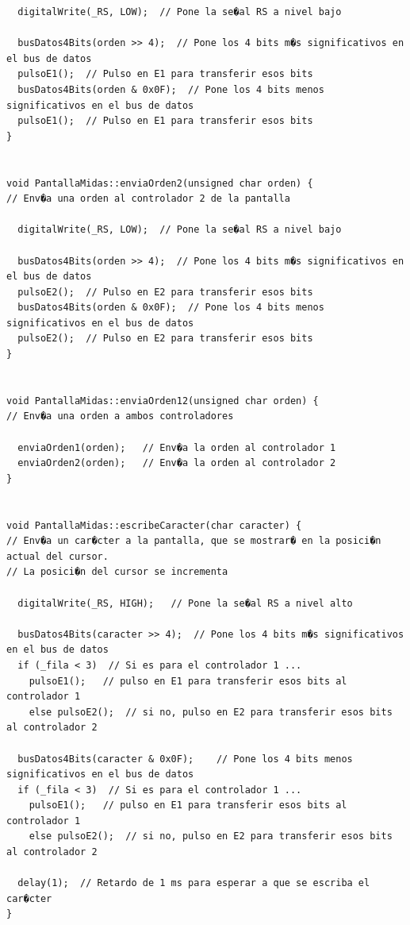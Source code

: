 \documentclass[11pt,twoside]{book}
\begin{document}
\begin{lstlisting}
  digitalWrite(_RS, LOW);  // Pone la se�al RS a nivel bajo
  
  busDatos4Bits(orden >> 4);  // Pone los 4 bits m�s significativos en el bus de datos
  pulsoE1();  // Pulso en E1 para transferir esos bits
  busDatos4Bits(orden & 0x0F);  // Pone los 4 bits menos significativos en el bus de datos
  pulsoE1();  // Pulso en E1 para transferir esos bits
}


void PantallaMidas::enviaOrden2(unsigned char orden) {
// Env�a una orden al controlador 2 de la pantalla

  digitalWrite(_RS, LOW);  // Pone la se�al RS a nivel bajo
  
  busDatos4Bits(orden >> 4);  // Pone los 4 bits m�s significativos en el bus de datos
  pulsoE2();  // Pulso en E2 para transferir esos bits
  busDatos4Bits(orden & 0x0F);  // Pone los 4 bits menos significativos en el bus de datos
  pulsoE2();  // Pulso en E2 para transferir esos bits
}


void PantallaMidas::enviaOrden12(unsigned char orden) {
// Env�a una orden a ambos controladores

  enviaOrden1(orden);   // Env�a la orden al controlador 1
  enviaOrden2(orden);   // Env�a la orden al controlador 2
}


void PantallaMidas::escribeCaracter(char caracter) {
// Env�a un car�cter a la pantalla, que se mostrar� en la posici�n actual del cursor. 
// La posici�n del cursor se incrementa

  digitalWrite(_RS, HIGH);   // Pone la se�al RS a nivel alto
  
  busDatos4Bits(caracter >> 4);  // Pone los 4 bits m�s significativos en el bus de datos
  if (_fila < 3)  // Si es para el controlador 1 ...
    pulsoE1();   // pulso en E1 para transferir esos bits al controlador 1
    else pulsoE2();  // si no, pulso en E2 para transferir esos bits al controlador 2
    
  busDatos4Bits(caracter & 0x0F);    // Pone los 4 bits menos significativos en el bus de datos
  if (_fila < 3)  // Si es para el controlador 1 ...
    pulsoE1();   // pulso en E1 para transferir esos bits al controlador 1
    else pulsoE2();  // si no, pulso en E2 para transferir esos bits al controlador 2
    
  delay(1);  // Retardo de 1 ms para esperar a que se escriba el car�cter
}
\end{lstlisting}
\end{document}
